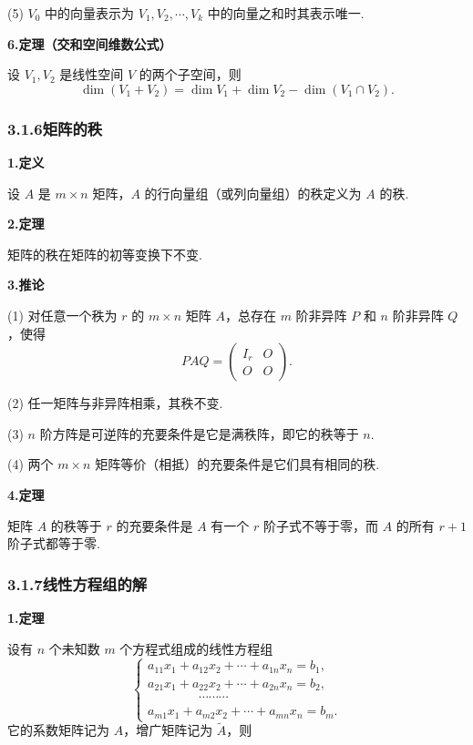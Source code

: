 \documentclass[UTF8,12pt,a4paper,fontset=fandol]{ctexart}
\begin{document}
(5) $V_0$ 中的向量表示为 $V_1,V_2,\cdots,V_k$ 中的向量之和时其表示唯一.

\noindent\textbf{6.\quad 定理（交和空间维数公式）}

设 $V_1,V_2$ 是线性空间 $V$ 的两个子空间，则
\[
\dim(V_1+V_2)=\dim V_1+\dim V_2-\dim(V_1\cap V_2).
\]

\subsubsection*{3.1.6\quad 矩阵的秩}

\noindent\textbf{1.\quad 定义}

设 $A$ 是 $m\times n$ 矩阵，$A$ 的行向量组（或列向量组）的秩定义为 $A$ 的秩.

\noindent\textbf{2.\quad 定理}

矩阵的秩在矩阵的初等变换下不变.

\noindent\textbf{3.\quad 推论}

(1) 对任意一个秩为 $r$ 的 $m\times n$ 矩阵 $A$，总存在 $m$ 阶非异阵 $P$ 和 $n$ 阶非异阵 $Q$，使得
\[
PAQ=
\begin{pmatrix}
I_r & O\\
O & O
\end{pmatrix}.
\]

(2) 任一矩阵与非异阵相乘，其秩不变.

(3) $n$ 阶方阵是可逆阵的充要条件是它是满秩阵，即它的秩等于 $n$.

(4) 两个 $m\times n$ 矩阵等价（相抵）的充要条件是它们具有相同的秩.

\noindent\textbf{4.\quad 定理}

矩阵 $A$ 的秩等于 $r$ 的充要条件是 $A$ 有一个 $r$ 阶子式不等于零，而 $A$ 的所有 $r+1$ 阶子式都等于零.

\subsubsection*{3.1.7\quad 线性方程组的解}

\noindent\textbf{1.\quad 定理}

设有 $n$ 个未知数 $m$ 个方程式组成的线性方程组
\[
\left\{
\begin{array}{l}
a_{11}x_1+a_{12}x_2+\cdots+a_{1n}x_n=b_1,\\
a_{21}x_1+a_{22}x_2+\cdots+a_{2n}x_n=b_2,\\
\hspace{4em}\cdots\cdots\cdots\\
a_{m1}x_1+a_{m2}x_2+\cdots+a_{mn}x_n=b_m.
\end{array}
\right.
\]
它的系数矩阵记为 $A$，增广矩阵记为 $\widetilde A$，则
\end{document}
